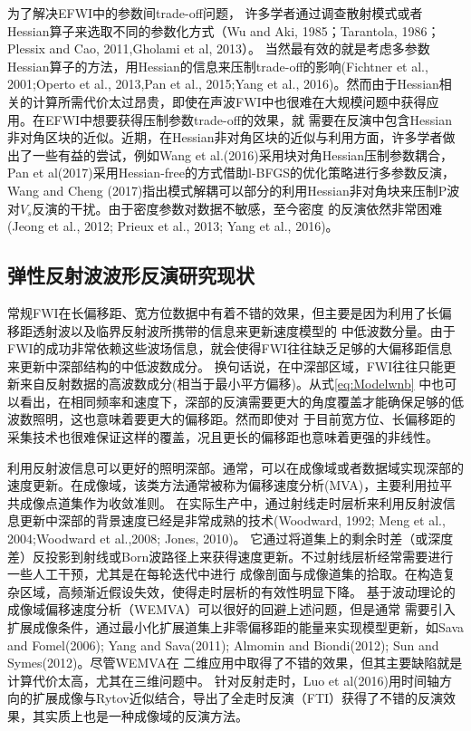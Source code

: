 为了解决EFWI中的参数间trade-off问题，
许多学者通过调查散射模式或者Hessian算子来选取不同的参数化方式（Wu and Aki, 1985\cite{wu.aki:1985}；Tarantola, 1986\cite{tarantola:1986}；
Plessix and Cao, 2011\cite{plessix.cao:2011},Gholami et al, 2013\cite{gholami2013}）。
当然最有效的就是考虑多参数Hessian算子的方法，用Hessian的信息来压制trade-off的影响(Fichtner et al., 2001\cite{fichtner2011hessian};Operto et al.,
2013\cite{operto2013guided},Pan et al., 2015\cite{pan2015estimation};Yang et al.,
2016\cite{Yang2016})。然而由于Hessian相关的计算所需代价太过昂贵，即使在声波FWI中也很难在大规模问题中获得应用。在EFWI中想要获得压制参数trade-off的效果，就
需要在反演中包含Hessian非对角区块的近似。近期，在Hessian非对角区块的近似与利用方面，许多学者做出了一些有益的尝试，例如Wang
et al.(2016)\cite{WangYuweiEtAl2016}采用块对角Hessian压制参数耦合，Pan et
al(2017)\cite{PanEtAl2017}采用Hessian-free的方式借助l-BFGS的优化策略进行多参数反演，Wang and Cheng
(2017)\cite{WangEtAl2017}指出模式解耦可以部分的利用Hessian非对角块来压制P波对$V_s$反演的干扰。由于密度参数对数据不敏感，至今密度
的反演依然非常困难(Jeong et al., 2012\cite{jeong2012full}; Prieux et al., 2013\cite{prieux:2013a}; Yang
et al., 2016\cite{Yang2016})。
\subsection{弹性反射波波形反演研究现状}
常规FWI在长偏移距、宽方位数据中有着不错的效果，但主要是因为利用了长偏移距透射波以及临界反射波所携带的信息来更新速度模型的
中低波数分量。由于FWI的成功非常依赖这些波场信息，就会使得FWI往往缺乏足够的大偏移距信息来更新中深部结构的中低波数成分。
换句话说，在中深部区域，FWI往往只能更新来自反射数据的高波数成分(相当于最小平方偏移)。从式\ref{eq:Modelwnb}
中也可以看出，在相同频率和速度下，深部的反演需要更大的角度覆盖才能确保足够的低波数照明，这也意味着要更大的偏移距。然而即使对
于目前宽方位、长偏移距的采集技术也很难保证这样的覆盖，况且更长的偏移距也意味着更强的非线性\cite{sirgue2006importance,virieux2009overview}。

利用反射波信息可以更好的照明深部。通常，可以在成像域或者数据域实现深部的速度更新。在成像域，该类方法通常被称为偏移速度分析(MVA)，主要利用拉平
共成像点道集作为收敛准则。
在实际生产中，通过射线走时层析来利用反射波信息更新中深部的背景速度已经是非常成熟的技术(Woodward,
1992\cite{Woodward1992}; Meng et al., 2004\cite{MengEtAl2004};Woodward et al.,2008\cite{
Woodward2008}; Jones, 2010\cite{Jones2010})。
它通过将道集上的剩余时差（或深度差）反投影到射线或Born波路径上来获得速度更新。不过射线层析经常需要进行一些人工干预，尤其是在每轮迭代中进行
成像剖面与成像道集的拾取。在构造复杂区域，高频渐近假设失效，使得走时层析的有效性明显下降。
基于波动理论的成像域偏移速度分析（WEMVA）可以很好的回避上述问题，但是通常
需要引入扩展成像条件，通过最小化扩展道集上非零偏移距的能量来实现模型更新，如Sava and
Fomel(2006)\cite{SavaEtAl2006}; Yang and Sava(2011)\cite{YangEtAl2011}; Almomin and
Biondi(2012)\cite{Almomin2012}; Sun and Symes(2012)\cite{SunEtAl2012}。尽管WEMVA在
二维应用中取得了不错的效果，但其主要缺陷就是计算代价太高，尤其在三维问题中。
针对反射走时，Luo et
al(2016)\cite{Luo2016}用时间轴方向的扩展成像与Rytov近似结合，导出了全走时反演（FTI）获得了不错的反演效果，其实质上也是一种成像域的反演方法。

